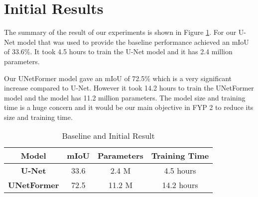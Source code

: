 \FloatBarrier

\section{Initial Results}

The summary of the result of our experiments is shown in Figure \ref{tab:result}. For our U-Net model that was used to provide the baseline performance achieved an mIoU of 33.6\%. It took 4.5 hours to train the U-Net model and it has 2.4 million parameters. 

Our UNetFormer model gave an mIoU of 72.5\% which is a very significant increase compared to U-Net. However it took 14.2 hours to train the UNetFormer model and the model has 11.2 million parameters. The model size and training time is a huge concern and it would be our main objective in FYP 2 to reduce its size and training time. 
\FloatBarrier
\begin{table}[!h]
\centering
\begin{tabular}{|c|c|c|c|}
\hline
\textbf{Model}      & \textbf{mIoU} & \textbf{Parameters} & \textbf{Training Time} \\ \hline
\textbf{U-Net}      & 33.6          & 2.4 M               & 4.5 hours              \\ \hline
\textbf{UNetFormer} & 72.5          & 11.2 M              & 14.2 hours             \\ \hline
\end{tabular}
\caption{Baseline and Initial Result}
\label{tab:result}
\end{table}
\FloatBarrier


